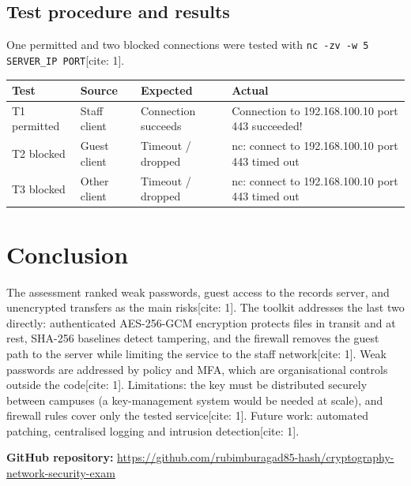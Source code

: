 \documentclass[11pt,a4paper]{article}
\newcommand{\repourl}{\url{https://github.com/rubimburagad85-hash/cryptography-network-security-exam}}
\begin{document}
\subsection{Test procedure and results}
One permitted and two blocked connections were tested with \texttt{nc -zv -w 5 SERVER\_IP PORT}[cite: 1].
\begin{center}
\begin{tabular}{@{}llp{3.3cm}p{4.5cm}@{}}
\toprule
Test & Source & Expected & Actual\\ \midrule
T1 permitted & Staff client & Connection succeeds & Connection to 192.168.100.10 port 443 succeeded!\\
T2 blocked & Guest client & Timeout / dropped & nc: connect to 192.168.100.10 port 443 timed out\\
T3 blocked & Other client & Timeout / dropped & nc: connect to 192.168.100.10 port 443 timed out\\ \bottomrule
\end{tabular}
\end{center}

\section{Conclusion}\label{sec:conclusion}
The assessment ranked weak passwords, guest access to the records server, and unencrypted transfers as the main risks[cite: 1].
The toolkit addresses the last two directly: authenticated AES-256-GCM encryption protects files in transit and at rest, SHA-256
baselines detect tampering, and the firewall removes the guest path to the server while limiting the service to the staff
network[cite: 1]. Weak passwords are addressed by policy and MFA, which are organisational controls outside the code[cite: 1]. Limitations: the key must
be distributed securely between campuses (a key-management system would be needed at scale), and firewall rules cover only
the tested service[cite: 1]. Future work: automated patching, centralised logging and intrusion detection[cite: 1].

\medskip
\noindent\textbf{GitHub repository:} \repourl
\end{document}
